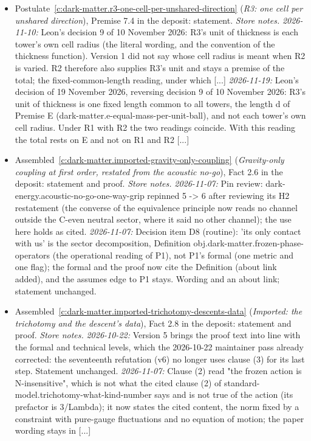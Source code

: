 \documentclass[11pt]{article}
\theoremstyle{definition}
\theoremstyle{plain}
\begin{document}
\begin{itemize}
\item Postulate~\ref{c:dark-matter.r3-one-cell-per-unshared-direction} (\emph{R3: one cell per unshared direction}), Premise 7.4 in the deposit: statement. \emph{Store notes.} \emph{2026-11-10:} Leon's decision 9 of 10 November 2026: R3's unit of thickness is each tower's own cell radius (the literal wording, and the convention of the thickness function). Version 1 did not say whose cell radius is meant when R2 is varied. R2 therefore also supplies R3's unit and stays a premise of the total; the fixed-common-length reading, under which [...] \emph{2026-11-19:} Leon's decision of 19 November 2026, reversing decision 9 of 10 November 2026: R3's unit of thickness is one fixed length common to all towers, the length d of Premise E (dark-matter.e-equal-mass-per-unit-ball), and not each tower's own cell radius. Under R1 with R2 the two readings coincide. With this reading the total rests on E and not on R1 and R2 [...]
\item Assembled~\ref{c:dark-matter.imported-gravity-only-coupling} (\emph{Gravity-only coupling at first order, restated from the acoustic no-go}), Fact 2.6 in the deposit: statement and proof. \emph{Store notes.} \emph{2026-11-07:} Pin review: dark-energy.acoustic-no-go-one-way-grip repinned 5 -> 6 after reviewing its H2 restatement (the converse of the equivalence principle now reads no channel outside the C-even neutral sector, where it said no other channel); the use here holds as cited. \emph{2026-11-07:} Decision item D8 (routine): 'its only contact with us' is the sector decomposition, Definition obj.dark-matter.frozen-phase-operators (the operational reading of P1), not P1's formal (one metric and one flag); the formal and the proof now cite the Definition (about link added), and the assumes edge to P1 stays. Wording and an about link; statement unchanged.
\item Assembled~\ref{c:dark-matter.imported-trichotomy-descents-data} (\emph{Imported: the trichotomy and the descent's data}), Fact 2.8 in the deposit: statement and proof. \emph{Store notes.} \emph{2026-10-22:} Version 5 brings the proof text into line with the formal and technical levels, which the 2026-10-22 maintainer pass already corrected: the seventeenth refutation (v6) no longer uses clause (3) for its last step. Statement unchanged. \emph{2026-11-07:} Clause (2) read "the frozen action is N-insensitive", which is not what the cited clause (2) of standard-model.trichotomy-what-kind-number says and is not true of the action (its prefactor is 3/Lambda); it now states the cited content, the norm fixed by a constraint with pure-gauge fluctuations and no equation of motion; the paper wording stays in [...]

\end{itemize}
\end{document}
